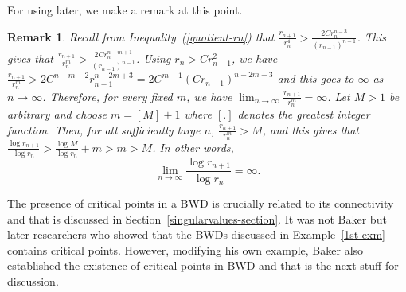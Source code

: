 \documentclass[11pt,a4paper]{article}
\newtheorem{Remark}{Remark}[section]
\begin{document}
	For using later, we make a remark at this point.
	\begin{Remark}
	Recall from Inequality~(\ref{quotient-rn}) that $ \frac{r_{n+1}}{r_n ^4}> \frac{2C r_{n}^{n-3}}{(r_{n-1})^{n-1}}$. This gives that $ \frac{r_{n+1}}{r_n ^m }> \frac{2C r_{n}^{n-m+1}}{ (r_{n-1})^{n-1}}$. Using $r_{n}> Cr^2_{n-1}$, we have  $ \frac{r_{n+1}}{r_n ^m }>  2C^{n-m+2} r_{n-1}^{n-2m+3} = 2 C^{m-1}(Cr_{n-1})^{n-2m+3} $ and this goes to $\infty$ as $n \to \infty$. Therefore, for every fixed $m$, we have $\lim_{n\to\infty} \frac{r_{n+1}}{r^m_n} = \infty$. Let $M>1$ be arbitrary  and choose $m =[M]+1$ where $[.]$ denotes the greatest integer function. Then, for all sufficiently large $n$, $\frac{r_{n+1}}{r_n ^{m}}>M$, and this gives that $\frac{\log r_{n+1}}{\log r_n} > \frac{\log M}{\log r_n} +m > m >M$.  In other words, \begin{equation}
			\lim_{n\to\infty} \frac{\log r_{n+1}}{\log r_n} =\infty.
			\label{logrn-limit} \end{equation} 
	\end{Remark}
The presence of critical points in a BWD is crucially related to its connectivity and that is discussed in Section~\ref{singularvalues-section}.
	It was not Baker but later researchers who showed that the BWDs discussed in Example~\ref{1st exm} contains critical points. However, modifying his own example, Baker also established the existence of critical points in BWD and that is the next stuff for discussion. 
 
\end{document}
